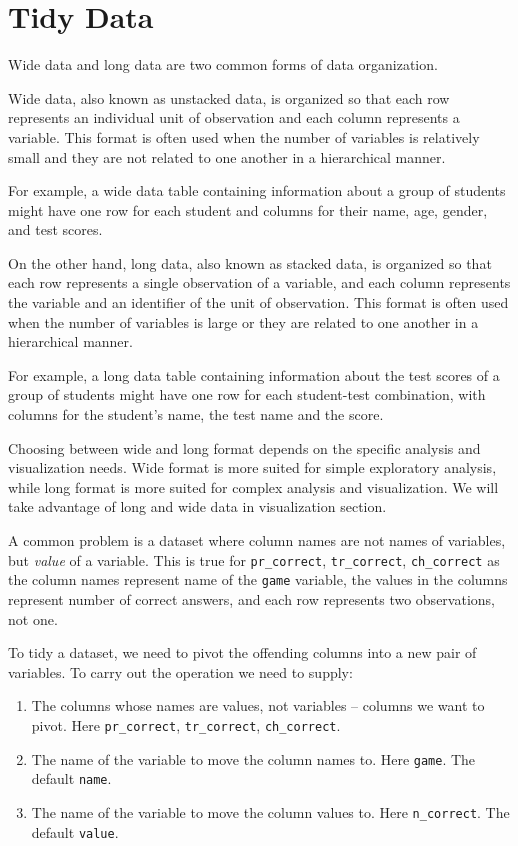 \documentclass[
  letterpaper,
]{book}
\providecommand{\tightlist}{%
  \setlength{\itemsep}{0pt}\setlength{\parskip}{0pt}}\usepackage{longtable,booktabs,array}
\begin{document}
\hypertarget{tidy-data}{%
\chapter{Tidy Data}\label{tidy-data}}

Wide data and long data are two common forms of data organization.

Wide data, also known as unstacked data, is organized so that each row
represents an individual unit of observation and each column represents
a variable. This format is often used when the number of variables is
relatively small and they are not related to one another in a
hierarchical manner.

For example, a wide data table containing information about a group of
students might have one row for each student and columns for their name,
age, gender, and test scores.

On the other hand, long data, also known as stacked data, is organized
so that each row represents a single observation of a variable, and each
column represents the variable and an identifier of the unit of
observation. This format is often used when the number of variables is
large or they are related to one another in a hierarchical manner.

For example, a long data table containing information about the test
scores of a group of students might have one row for each student-test
combination, with columns for the student's name, the test name and the
score.

Choosing between wide and long format depends on the specific analysis
and visualization needs. Wide format is more suited for simple
exploratory analysis, while long format is more suited for complex
analysis and visualization. We will take advantage of long and wide data
in visualization section.

A common problem is a dataset where column names are not names of
variables, but \emph{value} of a variable. This is true for
\texttt{pr\_correct}, \texttt{tr\_correct}, \texttt{ch\_correct} as the
column names represent name of the \texttt{game} variable, the values in
the columns represent number of correct answers, and each row represents
two observations, not one.

To tidy a dataset, we need to pivot the offending columns into a new
pair of variables. To carry out the operation we need to supply:

\begin{enumerate}
\def\labelenumi{\arabic{enumi}.}
\tightlist
\item
  The columns whose names are values, not variables -- columns we want
  to pivot. Here \texttt{pr\_correct}, \texttt{tr\_correct},
  \texttt{ch\_correct}.
\item
  The name of the variable to move the column names to. Here
  \texttt{game}. The default \texttt{name}.
\item
  The name of the variable to move the column values to. Here
  \texttt{n\_correct}. The default \texttt{value}.
\end{enumerate}
\end{document}
